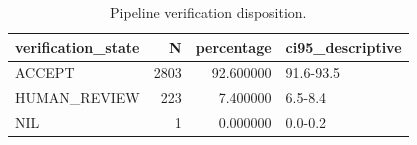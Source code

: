 \begin{table}
\caption{Pipeline verification disposition.}
\begin{tabular}{lrrl}
\toprule
verification\_state & N & percentage & ci95\_descriptive \\
\midrule
ACCEPT & 2803 & 92.600000 & 91.6-93.5 \\
HUMAN\_REVIEW & 223 & 7.400000 & 6.5-8.4 \\
NIL & 1 & 0.000000 & 0.0-0.2 \\
\bottomrule
\end{tabular}
\end{table}
